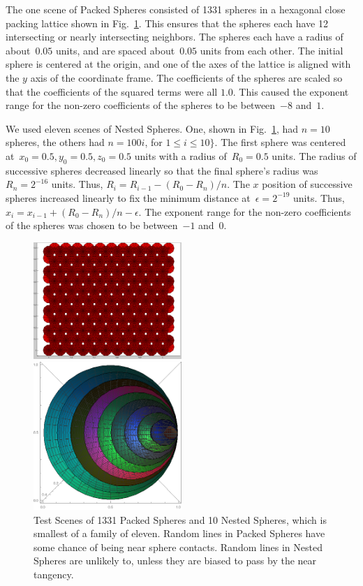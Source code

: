 \documentclass{cccg16}
\begin{document}
The one scene of Packed Spheres consisted of 1331
spheres in a hexagonal close packing lattice shown in Fig.~\ref{fig:testScenes}.  This ensures
that the spheres each have 12 intersecting or nearly intersecting
neighbors.  The spheres each have a radius of about~$0.05$ units, and
are spaced about~$0.05$ units from each other.  The initial sphere is
centered at the origin, and one of the axes of the lattice is aligned
with the $y$ axis of the coordinate frame.  The coefficients of the
spheres are scaled so that the coefficients of the squared terms were
all $1.0$. This caused the exponent range for the non-zero
coefficients of the spheres to be between~$-8$ and~$1$.

We used eleven scenes of Nested Spheres. One, shown in
Fig.~\ref{fig:testScenes}, had $n=10$ spheres, the others had
$n=100i$, for $1\leq i \leq 10\}$.  The first sphere was centered
at~$x_0=0.5, y_0=0.5, z_0=0.5$ units with a radius of~$R_0=0.5$ units.
The radius of successive spheres decreased linearly so that the final
sphere's radius was $R_n=2^{-16}$ units.  Thus,
$R_i=R_{i-1}-(R_0-R_n)/n$.  The $x$ position of successive spheres
increased linearly to fix the minimum distance at~$\epsilon=2^{-19}$
units. Thus, $x_i=x_{i-1}+(R_0-R_n)/n-\epsilon$.  The exponent range
for the non-zero coefficients of the spheres was chosen to be
between~$-1$ and~$0$.

\begin{figure}
  \includegraphics[width=0.5\textwidth]{imgs/packedSpheres.png}
  \vspace{5mm}
  
  \includegraphics[width=0.5\textwidth]{imgs/hardEllipsoidsSingle.png}
  \caption{Test Scenes of 1331 Packed Spheres and 10 Nested Spheres,
    which is smallest of a family of eleven.  Random lines in Packed
    Spheres have some chance of being near sphere contacts.  Random
    lines in Nested Spheres are unlikely to, unless they are biased to
    pass by the near tangency.}
  \label{fig:testScenes}
\end{figure}
\end{document}
